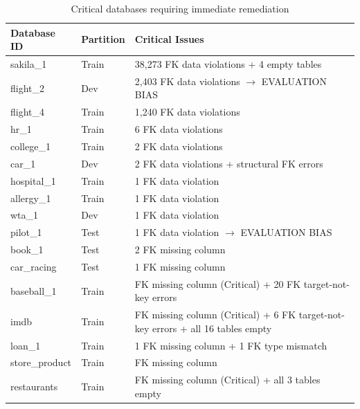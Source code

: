 \documentclass[print]{einformatica}
\begin{document}
\begin{table}[H]
    \caption{Critical databases requiring immediate remediation}
    \label{tab:critical_dbs}
    \centering
    \footnotesize
    \begin{tabular}{llp{}}
        \toprule
        \textbf{Database ID} & \textbf{Partition} & \textbf{Critical Issues} \\
        \midrule
        sakila\_1 & Train & 38,273 FK data violations + 4 empty tables \\
        flight\_2 & Dev & 2,403 FK data violations $\rightarrow$ EVALUATION BIAS \\
        flight\_4 & Train & 1,240 FK data violations \\
        hr\_1 & Train & 6 FK data violations \\
        college\_1 & Train & 2 FK data violations \\
        car\_1 & Dev & 2 FK data violations + structural FK errors \\
        hospital\_1 & Train & 1 FK data violation \\
        allergy\_1 & Train & 1 FK data violation \\
        wta\_1 & Dev & 1 FK data violation \\
        pilot\_1 & Test & 1 FK data violation $\rightarrow$ EVALUATION BIAS \\
        book\_1 & Test & 2 FK missing column \\
        car\_racing & Test & 1 FK missing column \\
        baseball\_1 & Train & FK missing column (Critical) + 20 FK target-not-key errors \\
        imdb & Train & FK missing column (Critical) + 6 FK target-not-key errors + all 16 tables empty \\
        loan\_1 & Train & 1 FK missing column + 1 FK type mismatch \\
        store\_product & Train & FK missing column \\
        restaurants & Train & FK missing column (Critical) + all 3 tables empty \\
        \bottomrule
    \end{tabular}
\end{table}

\FloatBarrier
\end{document}
